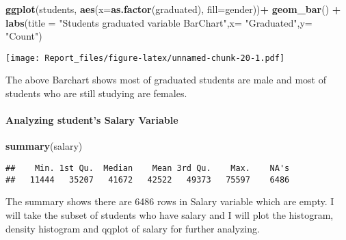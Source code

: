\documentclass[
]{article}
\newenvironment{Shaded}{\begin{snugshade}}{\end{snugshade}}
\newcommand{\DataTypeTok}[1]{\textcolor[rgb]{0.13,0.29,0.53}{#1}}
\newcommand{\KeywordTok}[1]{\textcolor[rgb]{0.13,0.29,0.53}{\textbf{#1}}}
\newcommand{\NormalTok}[1]{#1}
\newcommand{\OperatorTok}[1]{\textcolor[rgb]{0.81,0.36,0.00}{\textbf{#1}}}
\newcommand{\StringTok}[1]{\textcolor[rgb]{0.31,0.60,0.02}{#1}}
\begin{document}
\begin{Shaded}
\begin{Highlighting}[]
\KeywordTok{ggplot}\NormalTok{(students, }\KeywordTok{aes}\NormalTok{(}\DataTypeTok{x=}\KeywordTok{as.factor}\NormalTok{(graduated), }\DataTypeTok{fill=}\NormalTok{gender))}\OperatorTok{+}
\StringTok{  }\KeywordTok{geom_bar}\NormalTok{() }\OperatorTok{+}\StringTok{ }
\StringTok{  }\KeywordTok{labs}\NormalTok{(}\DataTypeTok{title =} \StringTok{"Students graduated variable BarChart"}\NormalTok{,}\DataTypeTok{x=} \StringTok{"Graduated"}\NormalTok{,}\DataTypeTok{y=} \StringTok{"Count"}\NormalTok{)}
\end{Highlighting}
\end{Shaded}

\texttt{[image: Report\_files/figure-latex/unnamed-chunk-20-1.pdf]}

The above Barchart shows most of graduated students are male and most of
students who are still studying are females.

\hypertarget{analyzing-students-salary-variable}{%
\paragraph{Analyzing student's Salary
Variable}\label{analyzing-students-salary-variable}}

\begin{Shaded}
\begin{Highlighting}[]
\KeywordTok{summary}\NormalTok{(salary)}
\end{Highlighting}
\end{Shaded}

\begin{verbatim}
##    Min. 1st Qu.  Median    Mean 3rd Qu.    Max.    NA's 
##   11444   35207   41672   42522   49373   75597    6486
\end{verbatim}

The summary shows there are 6486 rows in Salary variable which are
empty. I will take the subset of students who have salary and I will
plot the histogram, density histogram and qqplot of salary for further
analyzing.
\end{document}
